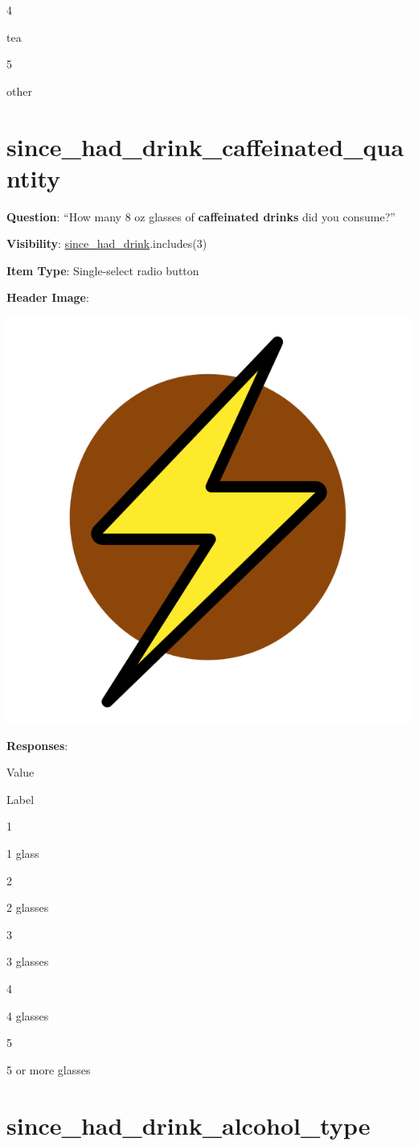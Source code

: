 \documentclass[]{book}
\begin{document}
4

tea

5

other

\hypertarget{since_had_drink_caffeinated_quantity}{%
\section{since\_had\_drink\_caffeinated\_quantity}\label{since_had_drink_caffeinated_quantity}}

\textbf{Question}: ``How many 8 oz glasses of \textbf{caffeinated drinks} did you consume?''

\textbf{Visibility}: \protect\hyperlink{since_had_drink}{since\_had\_drink}.includes(3)

\textbf{Item Type}: Single-select radio button

\textbf{Header Image}:

\begin{flushleft}\includegraphics[width=0.33\linewidth]{downloadFigs4latex_NIMH_Applet_Codebook/since_had_drink_caffeinated_quantity_headerImg} \end{flushleft}

\textbf{Responses}:

Value

Label

1

1 glass

2

2 glasses

3

3 glasses

4

4 glasses

5

5 or more glasses

\hypertarget{since_had_drink_alcohol_type}{%
\section{since\_had\_drink\_alcohol\_type}\label{since_had_drink_alcohol_type}}
\end{document}

